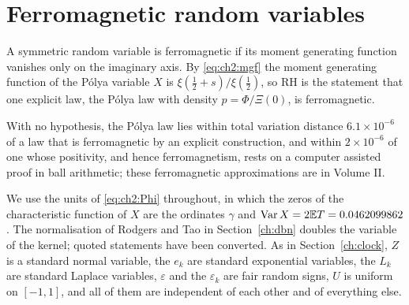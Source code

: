 \chapter{Ferromagnetic random variables}\label{chap:ferro}

A symmetric random variable is ferromagnetic if its moment generating function vanishes only on the imaginary axis. By \eqref{eq:ch2:mgf} the moment generating function of the P\'olya variable $X$ is $\xi(\frac12+s)/\xi(\frac12)$, so RH is the statement that one explicit law, the P\'olya law with density $p=\Phi/\Xi(0)$, is ferromagnetic.

With no hypothesis, the P\'olya law lies within total variation distance $6.1\times10^{-6}$ of a law that is ferromagnetic by an explicit construction, and within $2\times10^{-6}$ of one whose positivity, and hence ferromagnetism, rests on a computer assisted proof in ball arithmetic; these ferromagnetic approximations are in Volume II.

We use the units of \eqref{eq:ch2:Phi} throughout, in which the zeros of the characteristic function of $X$ are the ordinates $\gamma$ and $\operatorname{Var}X=2\mathbb{E} T=0.0462099862$. The normalisation of Rodgers and Tao in Section~\ref{ch:dbn} doubles the variable of the kernel; quoted statements have been converted. As in Section~\ref{ch:clock}, $Z$ is a standard normal variable, the $e_k$ are standard exponential variables, the $L_k$ are standard Laplace variables, $\varepsilon$ and the $\varepsilon_k$ are fair random signs, $U$ is uniform on $[-1,1]$, and all of them are independent of each other and of everything else.
